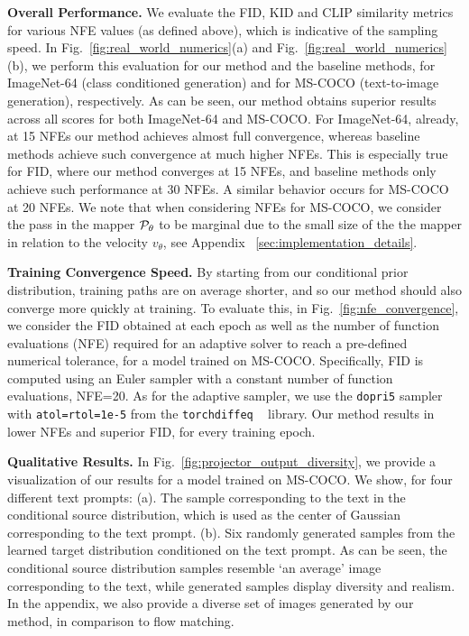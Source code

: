 \noindent \textbf{Overall Performance.} \quad
We evaluate the FID, KID and CLIP similarity metrics for various NFE values (as defined above), which is indicative of the sampling speed. 
In Fig.~\ref{fig:real_world_numerics}(a) and Fig.~\ref{fig:real_world_numerics}(b), we perform this evaluation for our method and the baseline methods, for ImageNet-64 (class conditioned generation) and for MS-COCO (text-to-image generation), respectively. 
As can be seen, our method obtains superior results across all scores for both ImageNet-64 and MS-COCO. For ImageNet-64, already, at 15 NFEs our method achieves almost full convergence, whereas baseline methods achieve such convergence at much higher NFEs. This is especially true for FID, where our method converges at 15 NFEs, and baseline methods only achieve such performance at 30 NFEs. A similar behavior occurs for MS-COCO at 20 NFEs. We note that when considering NFEs for MS-COCO, we consider the pass in the mapper ${\mathcal{P}}_\theta$ to be marginal due to the small size of the the mapper in relation to the velocity $v_\theta$, see Appendix ~\ref{sec:implementation_details}.




\noindent \textbf{Training Convergence Speed.} \quad By starting from our conditional prior distribution, training paths are on average shorter, and so our method should also converge more quickly at training. To evaluate this,
in Fig.~\ref{fig:nfe_convergence}, we consider the FID obtained at each epoch as well as the number of function evaluations (NFE) required for an adaptive solver to reach a pre-defined numerical tolerance, for a model trained on MS-COCO. Specifically,
FID is computed using an Euler sampler with a constant number of function evaluations, NFE=20. As for the adaptive sampler, we use the \texttt{dopri5} sampler with \texttt{atol=rtol=1e-5} from the \texttt{torchdiffeq} ~\citep{torchdiffeq} library.  Our method results in lower NFEs and superior FID, for every training epoch. %



\noindent \textbf{Qualitative Results.} \quad
In Fig.~\ref{fig:projector_output_diversity}, we provide a visualization of our results for a model trained on MS-COCO. We show, for four different text prompts: (a). The sample corresponding to the text in the conditional source distribution, which is used as the center of Gaussian corresponding to the text prompt. (b). Six randomly generated samples from the learned target distribution conditioned on the text prompt. As can be seen, the conditional source distribution samples resemble `an average' image corresponding to the text, while generated samples display diversity and realism. In the appendix, 
we also provide a diverse set of images generated by our method, in comparison to flow matching. 


